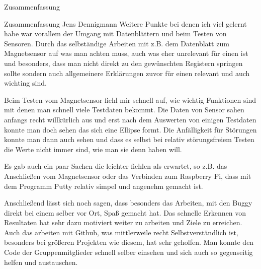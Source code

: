 \documentclass[12pt]{report}
\begin{document}
\begin{section}{Zusammenfassung}
\begin{subsection}{Zusammenfassung Jens Dennigmann}
  Weitere Punkte bei denen ich viel gelernt habe war vorallem der Umgang mit Datenblättern 
  und beim Testen von Sensoren. Durch das selbständige Arbeiten mit z.B. dem Datenblatt zum 
  Magnetsensor auf was man achten muss, auch was eher unrelevant für einen ist und besonders, 
  dass man nicht direkt zu den gewünschten Registern springen sollte sondern auch 
  allgemeinere Erklärungen zuvor für einen relevant und auch wichting sind.
  
  Beim Testen vom Magnetsensor fiehl mir schnell auf, wie wichtig Funktionen sind mit denen 
  man schnell viele Testdaten bekommt. Die Daten von Sensor sahen anfangs recht willkürlich 
  aus und erst nach dem Auswerten von einigen Testdaten konnte man doch sehen das sich eine 
  Ellipse formt. Die Anfälligkeit für Störungen konnte man dann auch sehen und dass es selbst 
  bei relativ störungsfreiem Testen die Werte nicht immer sind, wie man sie denn haben will.
  
  Es gab auch ein paar Sachen die leichter fiehlen als erwartet, so z.B. das Anschließen vom 
  Magnetsensor oder das Verbinden zum Raspberry Pi, dass mit dem Programm Putty relativ simpel 
  und angenehm gemacht ist. 
  
  Anschließend lässt sich noch sagen, dass besonders das Arbeiten, mit den Buggy direkt bei 
  einem selber vor Ort, Spaß gemacht hat. Das schnelle Erkennen von Resultaten hat sehr dazu 
  motiviert weiter zu arbeiten und Ziele zu erreichen. Auch das arbeiten mit Github, was 
  mittlerweile recht Selbstverständlich ist, besonders bei größeren Projekten wie diesem, hat 
  sehr geholfen. Man konnte den Code der Gruppenmitglieder schnell selber einsehen und sich 
  auch so gegenseitig helfen und austauschen.
  \end{subsection}
\end{section}
\end{document}
